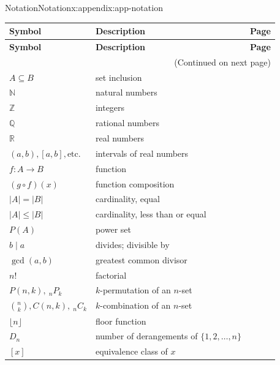 \documentclass[oneside,10pt,]{book}
\numberwithin{equation}{section}
\begin{document}
\begin{appendixptx}{Notation}{}{Notation}{}{}{x:appendix:app-notation}
\begin{longtable}[l]{lp{}r}
\addtocounter{table}{-1}
\textbf{Symbol}&\textbf{Description}&\textbf{Page}\\[1em]
\endfirsthead
\textbf{Symbol}&\textbf{Description}&\textbf{Page}\\[1em]
\endhead
\multicolumn{3}{r}{(Continued on next page)}\\
\endfoot
\endlastfoot
\(A \subseteq B\)&set inclusion&\pageref{g:notation:id438299}\\
\(\mathbb{N}\)&natural numbers&\pageref{g:notation:id464871}\\
\(\mathbb{Z}\)&integers&\pageref{g:notation:id464846}\\
\(\mathbb{Q}\)&rational numbers&\pageref{g:notation:id464852}\\
\(\mathbb{R}\)&real numbers&\pageref{g:notation:id464900}\\
\((a,b), [a,b], \text{etc.}\)&intervals of real numbers&\pageref{g:notation:id464877}\\
\(f: A \rightarrow B\)&function&\pageref{g:notation:id464941}\\
\((g \circ f)(x)\)&function composition&\pageref{g:notation:id462867}\\
\(|A| = |B|\)&cardinality, equal&\pageref{g:notation:id462943}\\
\(|A| \leq |B|\)&cardinality, less than or equal&\pageref{g:notation:id462919}\\
\(P(A)\)&power set&\pageref{g:notation:id463028}\\
\(b \mid a\)&divides; divisible by&\pageref{g:notation:id463421}\\
\(\gcd(a,b)\)&greatest common divisor&\pageref{g:notation:id463621}\\
\(n!\)&factorial&\pageref{g:notation:id474034}\\
\(P(n,k),\ {}_nP_k\)&\(k\)-permutation of an \(n\)-set&\pageref{g:notation:id474321}\\
\(\binom{n}{k}, C(n,k),\ {}_nC_k\)&\(k\)-combination of an \(n\)-set&\pageref{g:notation:id473387}\\
\(\lfloor n \rfloor\)&floor function&\pageref{g:notation:id480587}\\
\(D_n\)&number of derangements of \(\{1,2,\ldots,n\}\)&\pageref{g:notation:id429016}\\
\([x]\)&equivalence class of \(x\)&\pageref{g:notation:id442999}\\

\end{longtable}
\end{appendixptx}
\end{document}
